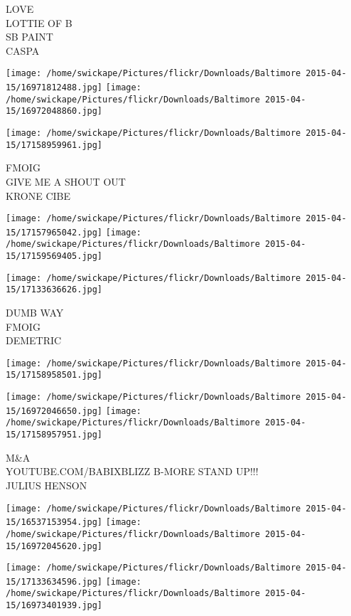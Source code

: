 \documentclass[10pt,letterpaper]{article}
\begin{document}
LOVE\\
LOTTIE OF B\\
SB PAINT\\
CASPA
\pagebreak

\texttt{[image: /home/swickape/Pictures/flickr/Downloads/Baltimore 2015-04-15/16971812488.jpg]}
\texttt{[image: /home/swickape/Pictures/flickr/Downloads/Baltimore 2015-04-15/16972048860.jpg]}

\vspace{0.25in}
\texttt{[image: /home/swickape/Pictures/flickr/Downloads/Baltimore 2015-04-15/17158959961.jpg]}

FMOIG\\
GIVE ME A SHOUT OUT\\
KRONE CIBE
\pagebreak

\texttt{[image: /home/swickape/Pictures/flickr/Downloads/Baltimore 2015-04-15/17157965042.jpg]}
\texttt{[image: /home/swickape/Pictures/flickr/Downloads/Baltimore 2015-04-15/17159569405.jpg]}

\texttt{[image: /home/swickape/Pictures/flickr/Downloads/Baltimore 2015-04-15/17133636626.jpg]}

DUMB WAY\\
FMOIG\\
DEMETRIC
\pagebreak

\texttt{[image: /home/swickape/Pictures/flickr/Downloads/Baltimore 2015-04-15/17158958501.jpg]}

\vspace{0.25in}
\texttt{[image: /home/swickape/Pictures/flickr/Downloads/Baltimore 2015-04-15/16972046650.jpg]}
\texttt{[image: /home/swickape/Pictures/flickr/Downloads/Baltimore 2015-04-15/17158957951.jpg]}

M\&A\\
YOUTUBE.COM/BABIXBLIZZ B{-}MORE STAND UP!!!\\
JULIUS HENSON
\pagebreak

\texttt{[image: /home/swickape/Pictures/flickr/Downloads/Baltimore 2015-04-15/16537153954.jpg]}
\texttt{[image: /home/swickape/Pictures/flickr/Downloads/Baltimore 2015-04-15/16972045620.jpg]}

\texttt{[image: /home/swickape/Pictures/flickr/Downloads/Baltimore 2015-04-15/17133634596.jpg]}
\texttt{[image: /home/swickape/Pictures/flickr/Downloads/Baltimore 2015-04-15/16973401939.jpg]}
\end{document}
